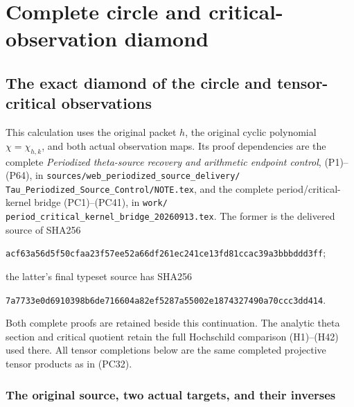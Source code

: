 \begingroup

\section{Complete circle and critical-observation diamond}


\subsection{The exact diamond of the circle and tensor-critical observations}
\label{sec:circle-critical-diamond}

This calculation uses the original packet $h$, the original cyclic
polynomial $\chi=\chi_{h,k}$, and both actual observation maps.  Its
proof dependencies are the complete \emph{Periodized theta-source
recovery and arithmetic endpoint control}, (P1)--(P64), in
\texttt{sources/web\_periodized\_source\_delivery/}
\texttt{Tau\_Periodized\_Source\_Control/NOTE.tex}, and the complete
period/critical-kernel bridge (PC1)--(PC41), in
\texttt{work/}\allowbreak
\texttt{period\_critical\_kernel\_bridge\_20260913.tex}.
The former is the delivered source of SHA256
\par\noindent
\texttt{acf63a56d5f50cfaa23f57ee52a66df261ec241ce13fd81ccac39a3bbbddd3ff};
\par\noindent
the latter's final typeset source has SHA256
\par\noindent
\texttt{7a7733e0d6910398b6de716604a82ef5287a55002e1874327490a70ccc3dd414}.
\par\noindent
Both complete proofs are retained beside this continuation.  The
analytic theta section and critical quotient retain the full
Hochschild comparison (H1)--(H42) used there.  All tensor completions
below are the same completed projective tensor products as in (PC32).

\subsubsection{The original source, two actual targets, and their inverses}

